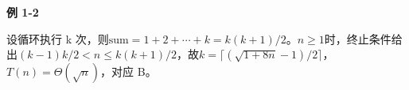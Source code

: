 {\color{ink}\bfseries 例 1-2}\par\vspace{1bp}设循环执行 k 次，则\(\mathrm{sum}=\allowbreak{}1+\allowbreak{}2+\allowbreak{}\cdots +\allowbreak{}k=\allowbreak{}k(k+\allowbreak{}1)/\allowbreak{}2\)。\(n\ge 1\)时，终止条件给出\((k-1)k/\allowbreak{}2<\allowbreak{}n\le k(k+\allowbreak{}1)/\allowbreak{}2\)，故\(k=\allowbreak{}\lceil (\sqrt{1+\allowbreak{}8n}-1)/\allowbreak{}2\rceil \)，\(T(n)=\allowbreak{}\Theta (\sqrt{n})\)，对应 B。
